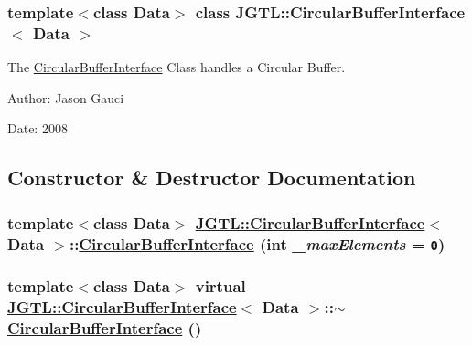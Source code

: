 \subsubsection*{template$<$class Data$>$ class JGTL::Circular\-Buffer\-Interface$<$ Data $>$}

The \hyperlink{class_j_g_t_l_1_1_circular_buffer_interface}{Circular\-Buffer\-Interface} Class handles a Circular Buffer. 

\begin{Desc}
\item[Author:]Jason Gauci \end{Desc}
\begin{Desc}
\item[Date:]2008 \end{Desc}




\subsection{Constructor \& Destructor Documentation}
\hypertarget{class_j_g_t_l_1_1_circular_buffer_interface_abf78d1a386ecba4d20d5153c52e14f7}{
\subsubsection[CircularBufferInterface]{\setlength{\rightskip}{0pt plus 5cm}template$<$class Data$>$ \hyperlink{class_j_g_t_l_1_1_circular_buffer_interface}{JGTL::Circular\-Buffer\-Interface}$<$ Data $>$::\hyperlink{class_j_g_t_l_1_1_circular_buffer_interface}{Circular\-Buffer\-Interface} (int {\em \_\-max\-Elements} = {\tt 0})}}
\label{class_j_g_t_l_1_1_circular_buffer_interface_abf78d1a386ecba4d20d5153c52e14f7}


\hypertarget{class_j_g_t_l_1_1_circular_buffer_interface_ab1efe15a8613de6b499f4165f3eb369}{
\subsubsection[$\sim$CircularBufferInterface]{\setlength{\rightskip}{0pt plus 5cm}template$<$class Data$>$ virtual \hyperlink{class_j_g_t_l_1_1_circular_buffer_interface}{JGTL::Circular\-Buffer\-Interface}$<$ Data $>$::$\sim$\hyperlink{class_j_g_t_l_1_1_circular_buffer_interface}{Circular\-Buffer\-Interface} ()}}
\label{class_j_g_t_l_1_1_circular_buffer_interface_ab1efe15a8613de6b499f4165f3eb369}




